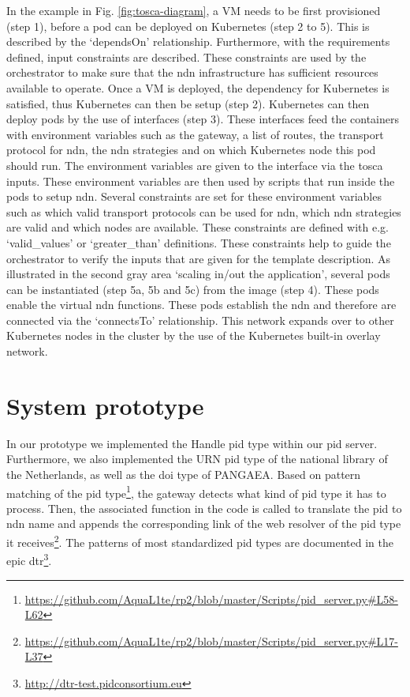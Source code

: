 \documentclass[conference]{IEEEtran}
\begin{document}
In the example in Fig. \ref{fig:tosca-diagram},  a VM needs to be first provisioned (step 1), before a pod can be deployed on Kubernetes (step 2 to 5). This is described by the `dependsOn' relationship. Furthermore, with the requirements defined, input constraints are described. These constraints are used by the orchestrator to make sure that the \gls{ndn} infrastructure has sufficient resources available to operate. Once a VM is deployed, the dependency for Kubernetes is satisfied, thus Kubernetes can then be setup (step 2). Kubernetes can then deploy pods by the use of interfaces (step 3). These interfaces feed the containers with environment variables such as the gateway, a list of routes, the transport protocol for \gls{ndn}, the \gls{ndn} strategies and on which Kubernetes node this pod should run. The environment variables are given to the interface via the \gls{tosca} inputs. These environment variables are then used by scripts that run inside the pods to setup \gls{ndn}. Several constraints are set for these environment variables such as which valid transport protocols can be used for \gls{ndn}, which \gls{ndn} strategies are valid and which nodes are available. These constraints are defined with e.g. `valid\_values' or `greater\_than' definitions. These constraints help to guide the orchestrator to verify the inputs that are given for the template description. As illustrated in the second gray area `scaling in/out the application', several pods can be instantiated (step 5a, 5b and 5c) from the image (step 4). These pods enable the virtual \gls{ndn} functions. These pods establish the \gls{ndn} and therefore are connected via the `connectsTo' relationship. This network expands over to other Kubernetes nodes in the cluster by the use of the Kubernetes built-in overlay network.

\section{System prototype}
\label{ndn-planning-deployment}

In our prototype we implemented the Handle \gls{pid} type within our \gls{pid} server. Furthermore, we also implemented the URN \gls{pid} type of the national library of the Netherlands, as well as the \gls{doi} type of PANGAEA. Based on pattern matching of the \gls{pid} type\footnote{\url{https://github.com/AquaL1te/rp2/blob/master/Scripts/pid_server.py#L58-L62}}, the gateway detects what kind of \gls{pid} type it has to process. Then, the associated function in the code is called to translate the \gls{pid} to \gls{ndn} name and appends the corresponding link of the web resolver of the \gls{pid} type it receives\footnote{\url{https://github.com/AquaL1te/rp2/blob/master/Scripts/pid_server.py#L17-L37}}. The patterns of most standardized \gls{pid} types are documented in the \gls{epic} \gls{dtr}\footnote{\url{http://dtr-test.pidconsortium.eu}}.
\end{document}

